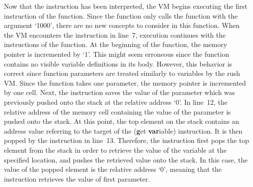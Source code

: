 Now that the  instruction has been interpreted, the VM begins executing the first instruction of the  function.
Since the  function only calls the  function with the argument `1000', there are no new concepts to consider in this function.
When the VM encounters the  instruction in line~7, execution continues with the instructions of the  function.
At the beginning of the  function, the memory pointer is incremented by `1'.
This might seem erroneous since the  function contains no visible variable definitions in its body.
However, this behavior is correct since function parameters are treated similarly to variables by the rush VM\@.
Since the function takes one parameter, the memory pointer is incremented by one cell.
Next, the  instruction saves the value of the parameter which was previously pushed onto the stack at the relative address `0'.
In line~12, the relative address of the memory cell containing the value of the parameter is pushed onto the stack.
At this point, the top element on the stack contains an address value referring to the target of the  (\textbf{g}et \textbf{var}iable) instruction.
It is then popped by the  instruction in line~13.
Therefore, the instruction first pops the top element from the stack in order to
retrieve the value of the variable at the specified location, and pushes the retrieved value onto the stack.
In this case, the value of the popped element is the relative address `0', meaning that the instruction retrieves the value of first parameter.

